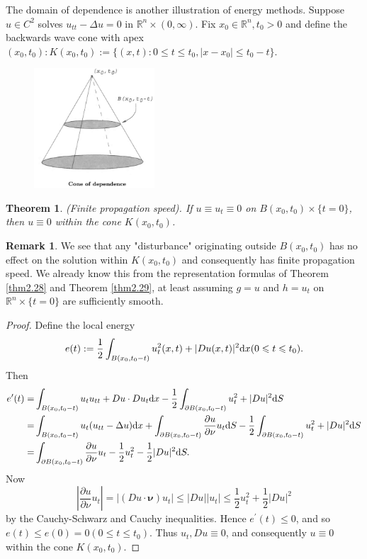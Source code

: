 \documentclass[hyperref,UTF8,12pt]{article}
\numberwithin{equation}{subsection}
\theoremstyle{plain}
\newtheorem{theorem}{Theorem}
\theoremstyle{definition}
\newtheorem{remark}{Remark}
\numberwithin{theorem}{section}
\numberwithin{lemma}{section}
\numberwithin{proposition}{section}
\numberwithin{remark}{section}
\numberwithin{corollary}{section}
\numberwithin{definition}{section}
\numberwithin{problem}{section}
\numberwithin{example}{section}
\def\dif{\textup{d}}
\newcommand{\ptl}{\partial}
\newcommand{\mr}{\mathbb{R}}
\renewcommand{\leq}{\leqslant}
\begin{document}
The domain of dependence is another illustration of energy methods. Suppose $u\in C^2$ solves $u_{tt}-\Delta u=0$ in $\mr^n\times(0,\infty)$. Fix $x_0\in\mr^n,t_0>0$ and define the backwards wave cone with apex $(x_0,t_0):K(x_0,t_0):=\{(x,t):0\leq t\leq t_0,|x-x_0|\leq t_0-t\}$.
\begin{figure}[h]
	\centering
	\includegraphics[width=0.4\textwidth]{cone.png}
\end{figure}
\begin{theorem}
(Finite propagation speed). If $u\equiv u_t\equiv0$ on $B(x_0,t_0)\times\{t=0\}$, then $u \equiv0$ within the cone $K(x_0,t_0)$.
\end{theorem}
\begin{remark}
We see that any "disturbance" originating outside $B\left(x_0, t_0\right)$ has no effect on the solution within $K(x_0,t_0)$ and consequently has finite propagation speed. We already know this from the representation formulas of Theorem \ref{thm2.28} and Theorem \ref{thm2.29}, at least assuming $g=u$ and $h=u_t$ on $\mr^n\times\{t=0\}$ are sufficiently smooth.
\end{remark}
\begin{proof}
Define the local energy
\[e(t):=\frac{1}{2}\int_{B(x_0,t_0-t)}u_t^2(x,t)+|Du(x,t)|^2\dif x(0\leq t\leq t_0).\] Then\[\begin{aligned}
	e^\prime(t)=&\int_{B(x_0,t_0-t)}u_tu_{tt}+Du\cdot Du_t\dif x-\frac{1}{2} \int_{\ptl B(x_0,t_0-t)}u_t^2+|Du|^2\dif S\\
	=&\int_{B(x_0,t_0-t)}u_t(u_{tt}-\Delta u)\dif x+\int_{\ptl B(x_0,t_0-t)}\frac{\ptl u}{\ptl\nu}u_t\dif S-\frac{1}{2}\int_{\ptl B(x_0,t_0-t)} u_t^2+|Du|^2\dif S\\
	=&\int_{\ptl B(x_0,t_0-t)}\frac{\ptl u}{\ptl\nu}u_t-\frac{1}{2}u_t^2-\frac{1}{2}|Du| ^2\dif S.
\end{aligned}\]Now\[\left|\frac{\ptl u}{\ptl\nu}u_t\right|=|(Du\cdot\bm{\nu}) u_t|\leq|Du||u_t|\leq\frac{1}{2}u_t^2+\frac{1}{2}|Du|^2\]by the Cauchy-Schwarz and Cauchy inequalities. Hence $e^\prime(t)\leq0$, and so $e(t)\leq e(0)=0(0\leq t\leq t_0)$. Thus $u_t,Du\equiv0$, and consequently $u\equiv0$ within the cone $K(x_0,t_0)$.
\end{proof}
\end{document}
